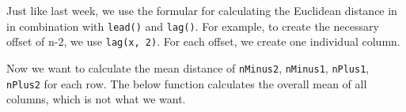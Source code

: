 \documentclass[]{book}
\newenvironment{Shaded}{\begin{snugshade}}{\end{snugshade}}
\newcommand{\CommentTok}[1]{\textcolor[rgb]{0.56,0.35,0.01}{\textit{#1}}}
\newcommand{\DataTypeTok}[1]{\textcolor[rgb]{0.13,0.29,0.53}{#1}}
\newcommand{\DecValTok}[1]{\textcolor[rgb]{0.00,0.00,0.81}{#1}}
\newcommand{\KeywordTok}[1]{\textcolor[rgb]{0.13,0.29,0.53}{\textbf{#1}}}
\newcommand{\NormalTok}[1]{#1}
\newcommand{\OperatorTok}[1]{\textcolor[rgb]{0.81,0.36,0.00}{\textbf{#1}}}
\newcommand{\StringTok}[1]{\textcolor[rgb]{0.31,0.60,0.02}{#1}}
\begin{document}
Just like last week, we use the formular for calculating the Euclidean distance in in combination with \texttt{lead()} and \texttt{lag()}. For example, to create the necessary offset of n-2, we use \texttt{lag(x,\ 2)}. For each offset, we create one individual column.

\begin{Shaded}
\end{Shaded}

Now we want to calculate the mean distance of \texttt{nMinus2}, \texttt{nMinus1}, \texttt{nPlus1}, \texttt{nPlus2} for each row. The below function calculates the overall mean of all columns, which is not what we want.
\end{document}
